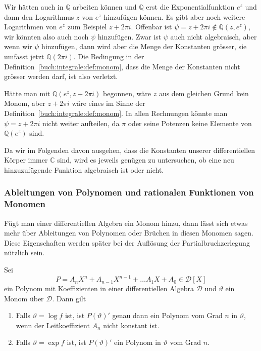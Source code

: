 \begin{beispiel}
Wir hätten auch in $\mathbb{Q}$ arbeiten können und $\mathbb{Q}$
erst die Exponentialfunktion $e^z$ und dann den Logarithmus $z$ von $e^z$
hinzufügen können.
Es gibt aber noch weitere Logarithmen von $e^z$ zum Beispiel $z+2\pi i$.
Offenbar ist $\psi=z+2\pi i\not\in \mathbb{Q}(z,e^z)$, wir könnten also
auch noch $\psi$ hinzufügen.
Zwar ist $\psi$ auch nicht algebraisch, aber wenn wir $\psi$ hinzufügen,
dann wird aber die Menge der Konstanten grösser, sie umfasst jetzt
$\mathbb{Q}(2\pi i)$.
Die Bedingung in der Definition~\ref{buch:integrale:def:monom},
dass die Menge der Konstanten nicht grösser werden darf, ist also
verletzt.

Hätte man mit $\mathbb{Q}(e^z, z+2\pi i)$ begonnen, wäre $z$ aus
dem gleichen Grund kein Monom, aber $z+2\pi i$ wäre eines im Sinne
der Definition~\ref{buch:integrale:def:monom}.
In allen Rechnungen könnte man $\psi=z+2\pi i$ nicht weiter aufteilen,
da $\pi$ oder seine Potenzen keine Elemente von $\mathbb{Q}(e^z)$ sind.
\end{beispiel}

Da wir im Folgenden davon ausgehen, dass die Konstanten unserer
differentiellen Körper immer $\mathbb{C}$ sind, wird es jeweils
genügen zu untersuchen, ob eine neu hinzuzufügende Funktion algebraisch
ist oder nicht.

\subsubsection{Ableitungen von Polynomen und rationalen Funktionen von Monomen}
Fügt man einer differentiellen Algebra ein Monom hinzu, dann lässt
sich etwas mehr über Ableitungen von Polynomen oder Brüchen in diesen
Monomen sagen.
Diese Eigenschaften werden später bei der Auflösung der Partialbruchzerlegung
nützlich sein.

\begin{satz}
Sei
\[
P
=
A_nX^n + A_{n-1}X^{n-1} + \dots A_1X+A_0
\in\mathscr{D}[X]
\]
ein Polynom mit Koeffizienten in einer differentiellen Algebra $\mathscr{D}$
und $\vartheta$ ein Monom über $\mathscr{D}$.
Dann gilt
\begin{enumerate}
\item
Falls $\vartheta=\log f$ ist, ist $P(\vartheta)'$ genau dann ein
Polynom vom Grad $n$ in $\vartheta$, wenn der Leitkoeffizient $A_n$
nicht konstant ist.
\item
Falls $\vartheta = \exp f$ ist, ist $P(\vartheta)'$ ein Polynom
in $\vartheta$ vom Grad $n$.
\end{enumerate}
\end{satz}

